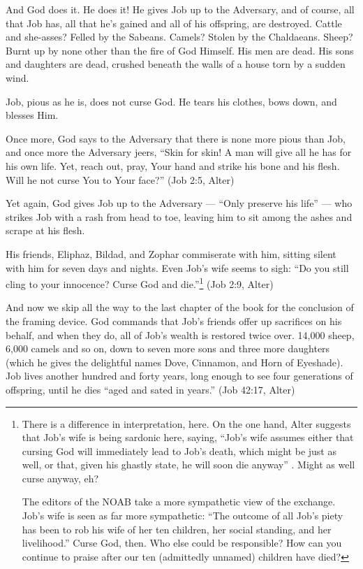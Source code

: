 And God does it. He does it! He gives Job up to the Adversary, and of course, all that Job has, all that he's gained and all of his offspring, are destroyed. Cattle and she-asses? Felled by the Sabeans. Camels? Stolen by the Chaldaeans. Sheep? Burnt up by none other than the fire of God Himself. His men are dead. His sons and daughters are dead, crushed beneath the walls of a house torn by a sudden wind.

Job, pious as he is, does not curse God. He tears his clothes, bows down, and blesses Him.

Once more, God says to the Adversary that there is none more pious than Job, and once more the Adversary jeers, ``Skin for skin! A man will give all he has for his own life. Yet, reach out, pray, Your hand and strike his bone and his flesh. Will he not curse You to Your face?'' (Job 2:5, Alter)

Yet again, God gives Job up to the Adversary --- ``Only preserve his life'' --- who strikes Job with a rash from head to toe, leaving him to sit among the ashes and scrape at his flesh.

His friends, Eliphaz, Bildad, and Zophar commiserate with him, sitting silent with him for seven days and nights. Even Job's wife seems to sigh: ``Do you still cling to your innocence? Curse God and die.''\footnote{There is a difference in interpretation, here. On the one hand, Alter suggests that Job's wife is being sardonic here, saying, ``Job's wife assumes either that cursing God will immediately lead to Job's death, which might be just as well, or that, given his ghastly state, he will soon die anyway'' \parencite[469]{alter}. Might as well curse anyway, eh?

The editors of the NOAB take a more sympathetic view of the exchange. Job's wife is seen as far more sympathetic: ``The outcome of all Job's piety has been to rob his wife of her ten children, her social standing, and her livelihood.'' \parencite[737]{noab} Curse God, then. Who else could be responsible? How can you continue to praise after our ten (admittedly unnamed) children have died?} (Job 2:9, Alter)

And now we skip all the way to the last chapter of the book for the conclusion of the framing device. God commands that Job's friends offer up sacrifices on his behalf, and when they do, all of Job's wealth is restored twice over. 14,000 sheep, 6,000 camels and so on, down to seven more sons and three more daughters (which he gives the delightful names Dove, Cinnamon, and Horn of Eyeshade). Job lives another hundred and forty years, long enough to see four generations of offspring, until he dies ``aged and sated in years.'' (Job 42:17, Alter)

